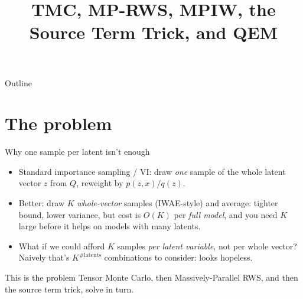 \documentclass[aspectratio=169]{beamer}
\title{TMC, MP-RWS, MPIW, the Source Term Trick, and QEM}
\author{}
\date{}
\begin{document}
\maketitle

\begin{frame}{Outline}
  \tableofcontents
\end{frame}

\section{The problem}

\begin{frame}{Why one sample per latent isn't enough}
  \begin{itemize}
    \item Standard importance sampling / VI: draw \emph{one} sample of the
      whole latent vector $z$ from $Q$, reweight by $p(z,x)/q(z)$.
    \item Better: draw $K$ \emph{whole-vector} samples (IWAE-style) and
      average: tighter bound, lower variance, but cost is $O(K)$ per
      \emph{full model}, and you need $K$ large before it helps on models
      with many latents.
    \item \alert{What if we could afford $K$ samples \emph{per latent
      variable}, not per whole vector?} Naively that's $K^{\#\text{latents}}$
      combinations to consider: looks hopeless.
  \end{itemize}
  \vfill
  This is the problem Tensor Monte Carlo, then Massively-Parallel RWS, and
  then the source term trick, solve in turn.
\end{frame}
\end{document}

